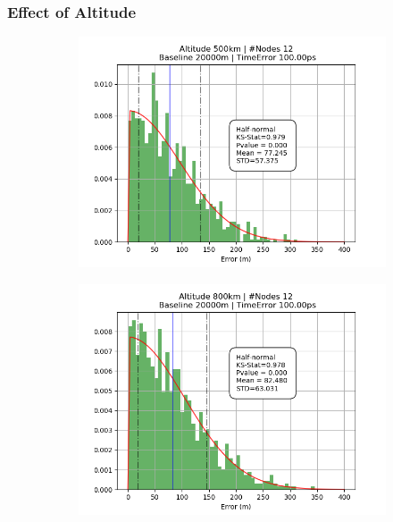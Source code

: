 \documentclass{article}
\begin{document}
\subsubsection{Effect of Altitude}
\begin{figure}[H]
  \centering
  \begin{subfigure}[b]{0.49\linewidth}
    \includegraphics[width=\linewidth]{figures/graphs/500_12_20000_100}
  \end{subfigure}
  \begin{subfigure}[b]{0.49\linewidth}
    \includegraphics[width=\linewidth]{figures/graphs/800_12_20000_100}
  \end{subfigure}
\end{figure}
\end{document}
